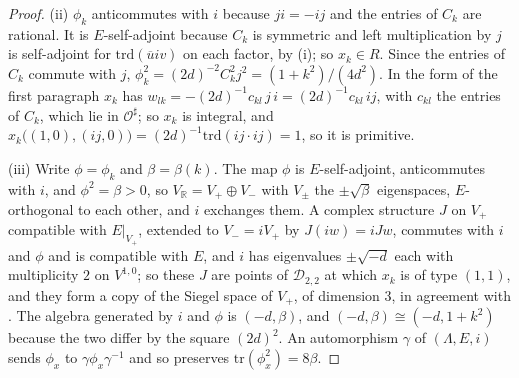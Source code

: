\documentclass[11pt,reqno]{amsart}
\theoremstyle{plain}
\theoremstyle{definition}
\theoremstyle{remark}
\newcommand{\RR}{\mathbb{R}}
\newcommand{\cO}{\mathcal{O}}
\newcommand{\cD}{\mathcal{D}}
\newcommand{\bbar}[1]{\overline{#1}}
\begin{document}
\begin{proof}
(ii) $\phi_{k}$ anticommutes with $i$ because $ji=-ij$ and the entries of
$C_{k}$ are rational. It is $E$-self-adjoint because $C_{k}$ is symmetric and
left multiplication by $j$ is self-adjoint for $\mathrm{trd}(\bbar{u}iv)$ on
each factor, by (i); so $x_{k}\in R$. Since the entries of
$C_{k}$ commute with $j$, $\phi_{k}^{2}=(2d)^{-2}C_{k}^{2}j^{2}=(1+k^{2})/(4d^{2})$.
In the form of the first paragraph $x_{k}$ has
$w_{lk}=-(2d)^{-1}c_{kl}\,j\,i=(2d)^{-1}c_{kl}\,ij$, with $c_{kl}$ the entries of
$C_{k}$, which lie in $\cO^{\sharp}$; so $x_{k}$ is integral, and
$x_{k}\bigl((1,0),(ij,0)\bigr)=(2d)^{-1}\mathrm{trd}(ij\cdot ij)=1$, so it is
primitive.

(iii) Write $\phi=\phi_{k}$ and $\beta=\beta(k)$. The map $\phi$ is
$E$-self-adjoint, anticommutes with $i$, and $\phi^{2}=\beta>0$, so
$V_{\RR}=V_{+}\oplus V_{-}$ with $V_{\pm}$ the $\pm\sqrt{\beta}$ eigenspaces,
$E$-orthogonal to each other, and $i$ exchanges them. A complex structure $J$
on $V_{+}$ compatible with $E|_{V_{+}}$, extended to $V_{-}=iV_{+}$ by
$J(iw)=iJw$, commutes with $i$ and $\phi$ and is compatible with $E$, and $i$
has eigenvalues $\pm\sqrt{-d}$ each with multiplicity $2$ on $V^{1,0}$; so
these $J$ are points of $\cD_{2,2}$ at which $x_{k}$ is of type $(1,1)$, and
they form a copy of the Siegel space of $V_{+}$, of dimension $3$, in
agreement with . The algebra generated by $i$ and $\phi$
is $(-d,\beta)$, and $(-d,\beta)\cong(-d,1+k^{2})$ because the two differ by
the square $(2d)^{2}$. An automorphism $\gamma$ of $(\Lambda,E,i)$ sends
$\phi_{x}$ to $\gamma\phi_{x}\gamma^{-1}$ and so preserves
$\mathrm{tr}(\phi_{x}^{2})=8\beta$.


\end{proof}
\end{document}
